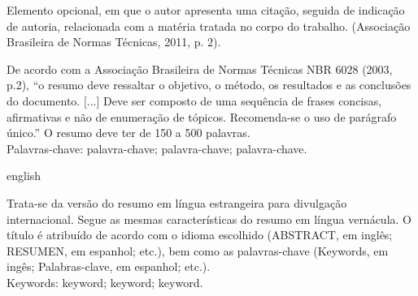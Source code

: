 \documentclass[
        oneside, %
        english,
        brazil
        ]{abntbibufjf}
\begin{document}

\begin{epigrafemais} %
    Elemento opcional, em que o autor apresenta uma citação, seguida de indicação de autoria, relacionada com a
    mat\'eria tratada no corpo do trabalho. (Associação Brasileira de Normas T\'ecnicas, 2011, p. 2).
\end{epigrafemais}



\begin{resumo}

    De acordo com a Associação Brasileira de Normas T\'ecnicas NBR 6028 (2003, p.2), ``o resumo deve ressaltar
    o objetivo, o m\'etodo, os resultados e as conclus\~oes do documento. [...] Deve ser composto de uma sequência de frases
    concisas, afirmativas e não de enumeração de tópicos. Recomenda-se o uso de parágrafo \'unico.''
    O resumo deve ter de 150 a 500 palavras. \\[18pt]
    Palavras-chave: palavra-chave; palavra-chave; palavra-chave. %
\end{resumo}


\begin{resumo}[ABSTRACT]
    \begin{otherlanguage*}{english}

        Trata-se da versão do resumo em língua estrangeira para divulgação internacional. Segue as mesmas características do resumo em
        língua vernácula. O título \'e atribuído de acordo com o idioma escolhido (ABSTRACT, em inglês; RESUMEN, em espanhol; etc.), bem como
        as palavras-chave (Keywords, em ingês; Palabras-clave, em espanhol; etc.). \\[18pt]
        Keywords: keyword; keyword; keyword. %
    \end{otherlanguage*}
\end{resumo}




\end{document}
